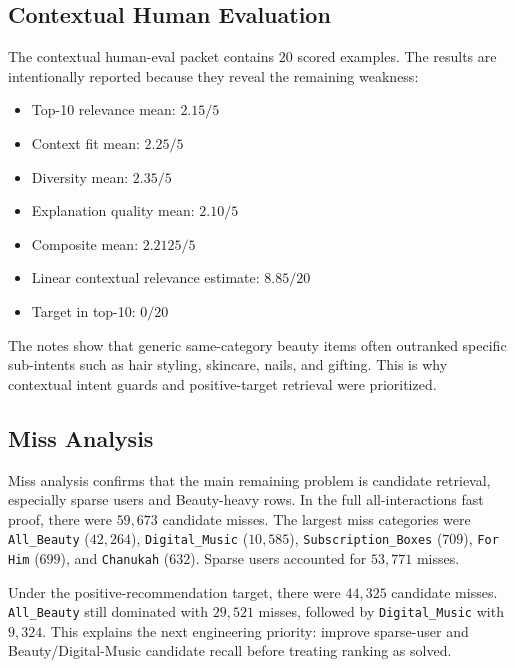 \documentclass[11pt,a4paper]{article}
\begin{document}
\subsection{Contextual Human Evaluation}
The contextual human-eval packet contains $20$ scored examples. The results are intentionally reported because they reveal the remaining weakness:
\begin{itemize}
    \item Top-10 relevance mean: $2.15/5$
    \item Context fit mean: $2.25/5$
    \item Diversity mean: $2.35/5$
    \item Explanation quality mean: $2.10/5$
    \item Composite mean: $2.2125/5$
    \item Linear contextual relevance estimate: $8.85/20$
    \item Target in top-10: $0/20$
\end{itemize}
The notes show that generic same-category beauty items often outranked specific sub-intents such as hair styling, skincare, nails, and gifting. This is why contextual intent guards and positive-target retrieval were prioritized.

\subsection{Miss Analysis}
Miss analysis confirms that the main remaining problem is candidate retrieval, especially sparse users and Beauty-heavy rows. In the full all-interactions fast proof, there were $59{,}673$ candidate misses. The largest miss categories were \texttt{All\_Beauty} ($42{,}264$), \texttt{Digital\_Music} ($10{,}585$), \texttt{Subscription\_Boxes} ($709$), \texttt{For Him} ($699$), and \texttt{Chanukah} ($632$). Sparse users accounted for $53{,}771$ misses.

Under the positive-recommendation target, there were $44{,}325$ candidate misses. \texttt{All\_Beauty} still dominated with $29{,}521$ misses, followed by \texttt{Digital\_Music} with $9{,}324$. This explains the next engineering priority: improve sparse-user and Beauty/Digital-Music candidate recall before treating ranking as solved.
\end{document}
